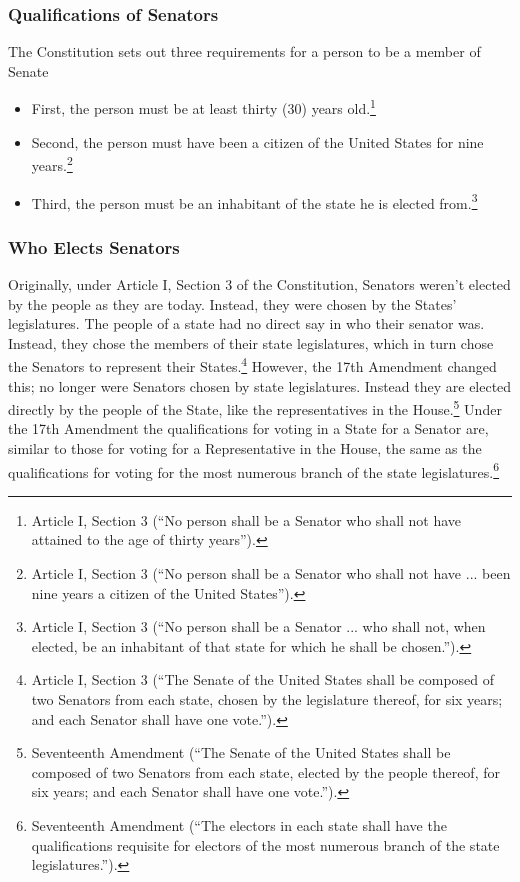 \subsubsection{Qualifications of Senators}
The Constitution sets out three requirements for a person to be a member of Senate

\begin{itemize}
\item First, the person must be at least thirty (30) years old.\footnote{Article I, Section 3 (``No person shall be a Senator who shall not have attained to the age of thirty years'').}
\item Second, the person must have been a citizen of the United States for nine years.\footnote{Article I, Section 3 (``No person shall be a Senator who shall not have ... been nine years a citizen of the United States'').}
\item Third, the person must be an inhabitant of the state he is elected from.\footnote{Article I, Section 3 (``No person shall be a Senator ... who shall not, when elected, be an inhabitant of that state for which he shall be chosen.'').}
\end{itemize}

\subsubsection{Who Elects Senators}
Originally, under Article I, Section 3 of the Constitution, Senators weren't elected by the people as they are today.  Instead, they were chosen by the States' legislatures.  The people of a state had no direct say in who their senator was.  Instead, they chose the members of their state legislatures, which in turn chose the Senators to represent their States.\footnote{Article I, Section 3 (``The Senate of the United States shall be composed of two Senators from each state, chosen by the legislature thereof, for six years; and each Senator shall have one vote.'').}
However, the 17th Amendment changed this; no longer were Senators chosen by state legislatures.  Instead they are elected directly by the people of the State, like the representatives in the House.\footnote{Seventeenth Amendment (``The Senate of the United States shall be composed of two Senators from each state, elected by the people thereof, for six years; and each Senator shall have one vote.'').}
Under the 17th Amendment the qualifications for voting in a State for a Senator are, similar to those for voting for a Representative in the House, the same as the qualifications for voting for the most numerous branch of the state legislatures.\footnote{Seventeenth Amendment (``The electors in each state shall have the qualifications requisite for electors of the most numerous branch of the state legislatures.'').}

